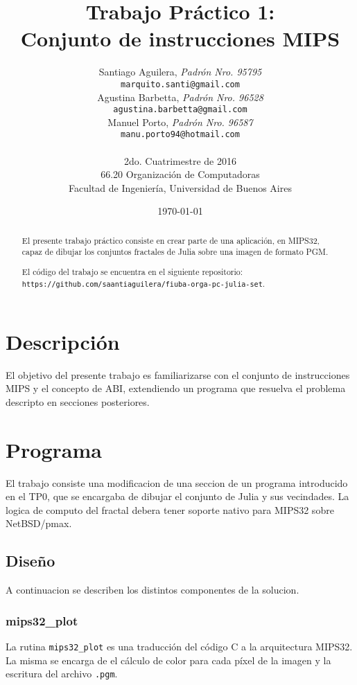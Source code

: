 \documentclass[10pt,a4paper]{article}
\title{\textbf{Trabajo Práctico 1:\\ Conjunto de instrucciones MIPS}}
\author{Santiago Aguilera, \textit{Padrón Nro. 95795}\\
        \texttt{marquito.santi@gmail.com}\\
        Agustina Barbetta, \textit{Padrón Nro. 96528}\\
        \texttt{agustina.barbetta@gmail.com}\\
        Manuel Porto, \textit{Padrón Nro. 96587}\\
        \texttt{manu.porto94@hotmail.com}\\
        \\[2.5ex]
        \normalsize{2do. Cuatrimestre de 2016}\\
        \normalsize{66.20 Organización de Computadoras}\\
        \normalsize{Facultad de Ingeniería, Universidad de Buenos Aires}\\
       }
\begin{document}
\date{\today}

\maketitle

\thispagestyle{empty}
\begin{abstract}
El presente trabajo práctico consiste en crear parte de una aplicación, en MIPS32, capaz de dibujar los conjuntos fractales de Julia sobre una imagen de formato PGM.

El código del trabajo se encuentra en el siguiente repositorio: \\
\texttt{https://github.com/saantiaguilera/fiuba-orga-pc-julia-set}.\\
\end{abstract}


\tableofcontents

\pagebreak

\section{Descripción}
El objetivo del presente trabajo es familiarizarse con el conjunto de instrucciones MIPS y el concepto de ABI, extendiendo un programa que resuelva el problema descripto en secciones posteriores.

\section{Programa}
El trabajo consiste una modificacion de una seccion de un programa introducido en el TP0, que se encargaba de dibujar el conjunto de Julia y sus vecindades. La logica de computo del fractal debera tener soporte nativo para MIPS32 sobre NetBSD/pmax.

\subsection{Diseño}
A continuacion se describen los distintos componentes de la solucion.

\subsubsection{mips32\_plot}
La rutina \texttt{mips32\_plot} es una traducción del código C a la arquitectura MIPS32. La misma se encarga de el cálculo de color para cada píxel de la imagen y la escritura del archivo \texttt{.pgm}. 
\end{document}
